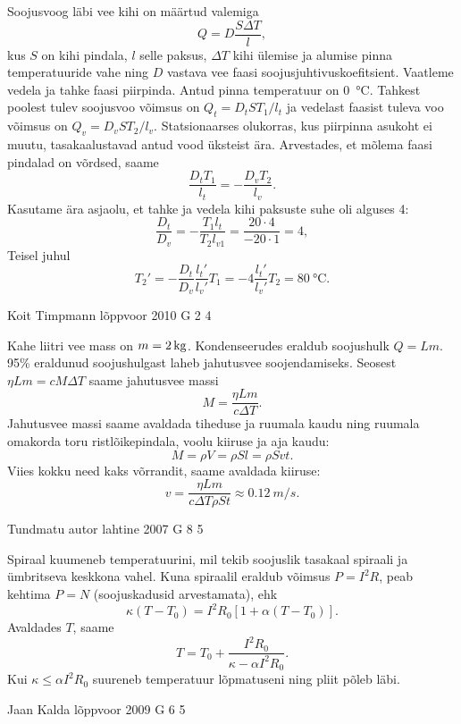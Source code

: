 \documentclass[11pt, twoside]{article}
\begin{document}
{{\ifSolution
Soojusvoog läbi vee kihi on määrtud valemiga
\[
Q = D\frac{S\Delta T}{l},
\]
kus $S$ on kihi pindala, $l$ selle paksus, $\Delta T$ kihi ülemise ja alumise pinna temperatuuride vahe ning $D$ vastava vee faasi soojusjuhtivuskoefitsient. Vaatleme vedela ja tahke faasi piirpinda. Antud pinna temperatuur on \SI{0}{\celsius}. Tahkest poolest tulev soojusvoo võimsus on
$Q_t = D_tST_1/l_t$
ja vedelast faasist tuleva voo võimsus on
$Q_v = D_vST_2/l_v$.
Statsionaarses olukorras, kus piirpinna asukoht ei muutu, tasakaalustavad antud vood üksteist ära. Arvestades, et mõlema faasi pindalad on võrdsed, saame
\[
\frac{D_tT_1}{l_t} = -\frac{D_vT_2}{l_v}.
\]
Kasutame ära asjaolu, et tahke ja vedela kihi paksuste suhe oli alguses \num{4}:
\[
\frac{D_t}{D_v} = -\frac{T_{1} l_{t}}{T_2 l_{v1}}=\frac{\num{20}\cdot \num{4}}{\num{-20}\cdot \num{1}} = \num{4},
\]
Teisel juhul
\[
T_{2}' = -\frac{D_{t}}{D_{v}}\frac{l_{t}'}{l_{v}'} T_1 = \num{-4}\frac{l_t'}{l_v'} T_2 = \SI{80}{\celsius}.
\]
\fi
}

{Koit Timpmann} %
{lõppvoor} %
{2010} %
{G 2} %
{4} %
{

\ifSolution
Kahe liitri vee mass on $m=\SI 2{kg}$. Kondenseerudes eraldub soojushulk $Q=Lm$.
95\% eraldunud soojushulgast laheb jahutusvee soojendamiseks. Seosest $\eta Lm=cM\Delta T$ saame jahutusvee massi
\[M=\frac {\eta L m}{c\Delta T}.\]
Jahutusvee massi saame avaldada tiheduse ja ruumala kaudu ning ruumala omakorda toru ristlõikepindala, voolu kiiruse ja aja kaudu:
\[M=\rho V=\rho Sl=\rho Svt.\]
Viies kokku need kaks võrrandit, saame avaldada kiiruse:
\[v=\frac {\eta Lm}{c\Delta T \rho S t}\approx \SI{0,12}{m/s}.\]
\fi
}

{Tundmatu autor} %
{lahtine} %
{2007} %
{G 8} %
{5} %
{

\ifSolution
Spiraal kuumeneb temperatuurini, mil tekib soojuslik tasakaal spiraali ja ümbritseva keskkona vahel. Kuna spiraalil eraldub võimsus $P = I^2R$, peab kehtima $P = N$ (soojuskadusid arvestamata), ehk
\[
\kappa\left(T-T_{0}\right)=I^{2} R_{0}\left[1+\alpha\left(T-T_{0}\right)\right].
\]
Avaldades $T$, saame
\[
T=T_{0}+\frac{I^{2} R_{0}}{\kappa-\alpha I^{2} R_{0}}.
\]
Kui $\kappa \leq \alpha I^2R_0$ suureneb temperatuur lõpmatuseni ning pliit põleb läbi.
\fi
}

{Jaan Kalda} %
{lõppvoor} %
{2009} %
{G 6} %
{5} %
{

}}
\end{document}
